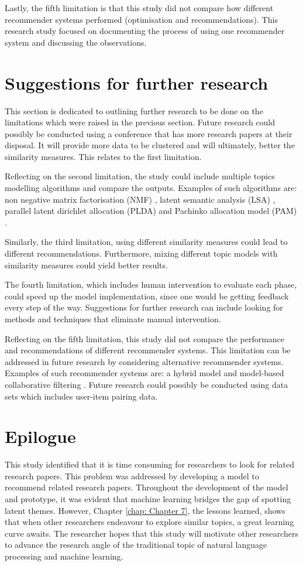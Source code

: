 Lastly, the fifth limitation is that this study did not compare how different recommender systems performed (optimisation and recommendations). This research study focused on documenting the process of using one recommender system and discussing the observations.

\section{Suggestions for further research}

This section is dedicated to outlining further research to be done on the limitations which were raised in the previous section. Future research could possibly be conducted using a conference that has more research papers at their disposal. It will provide more data to be clustered and will ultimately, better the similarity measures. This relates to the first limitation.

Reflecting on the second limitation, the study could include multiple topics modelling algorithms and compare the outputs. Examples of such algorithms are: non negative matrix factorisation (NMF) \cite{Purpura2018}, latent semantic analysis (LSA) \cite{Qomariyah2019}, parallel latent dirichlet allocation (PLDA) \cite{Mukherjee2019} and Pachinko allocation model (PAM) \cite{Koltcov2021}.

Similarly, the third limitation, using different similarity measures could lead to different recommendations. Furthermore, mixing different topic models with similarity measures could yield better results.

The fourth limitation, which includes human intervention to evaluate each phase, could speed up the model implementation, since one would be getting feedback every step of the way. Suggestions for further research can include looking for methods and techniques that eliminate manual intervention.

Reflecting on the fifth limitation, this study did not compare the performance and recommendations of different recommender systems. This limitation can be addressed in future research by considering alternative recommender systems. Examples of such recommender systems are: a hybrid model \cite{sharma2016evolution} and model-based collaborative filtering \cite{naak2009multi}. Future research could possibly be conducted using data sets which includes user-item pairing data.

\section{Epilogue}

This study identified that it is time consuming for researchers to look for related research papers. This problem was addressed by developing a model to recommend related research papers. 
Throughout the development of the model and prototype, it was evident that machine learning bridges the gap of spotting latent themes. However, Chapter \ref{chap: Chapter 7}, the lessons learned, shows that when other researchers endeavour to explore similar topics, a great learning curve awaits. The researcher hopes that this study will motivate other researchers to advance the research angle of the traditional topic of natural language processing and machine learning. 